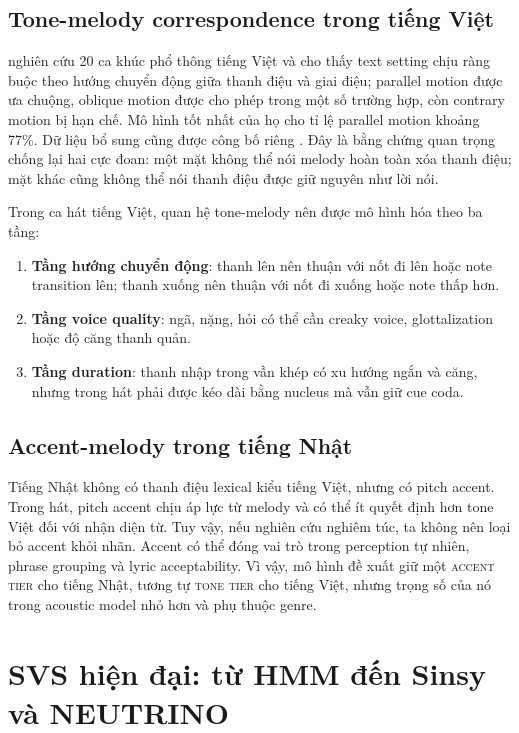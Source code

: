 \documentclass[12pt,a4paper]{article}
\newcommand{\tier}[1]{\textsc{#1}}
\begin{document}
\subsection{Tone-melody correspondence trong tiếng Việt}

\textcite{kirby2016toneMelody} nghiên cứu 20 ca khúc phổ thông tiếng Việt và cho thấy text setting chịu ràng buộc theo hướng chuyển động giữa thanh điệu và giai điệu; parallel motion được ưa chuộng, oblique motion được cho phép trong một số trường hợp, còn contrary motion bị hạn chế. Mô hình tốt nhất của họ cho tỉ lệ parallel motion khoảng 77\%. Dữ liệu bổ sung cũng được công bố riêng \parencite{kirby2016dataset}. Đây là bằng chứng quan trọng chống lại hai cực đoan: một mặt không thể nói melody hoàn toàn xóa thanh điệu; mặt khác cũng không thể nói thanh điệu được giữ nguyên như lời nói.

Trong ca hát tiếng Việt, quan hệ tone-melody nên được mô hình hóa theo ba tầng:

\begin{enumerate}
  \item \textbf{Tầng hướng chuyển động}: thanh lên nên thuận với nốt đi lên hoặc note transition lên; thanh xuống nên thuận với nốt đi xuống hoặc note thấp hơn.
  \item \textbf{Tầng voice quality}: ngã, nặng, hỏi có thể cần creaky voice, glottalization hoặc độ căng thanh quản.
  \item \textbf{Tầng duration}: thanh nhập trong vần khép có xu hướng ngắn và căng, nhưng trong hát phải được kéo dài bằng nucleus mà vẫn giữ cue coda.
\end{enumerate}

\subsection{Accent-melody trong tiếng Nhật}

Tiếng Nhật không có thanh điệu lexical kiểu tiếng Việt, nhưng có pitch accent. Trong hát, pitch accent chịu áp lực từ melody và có thể ít quyết định hơn tone Việt đối với nhận diện từ. Tuy vậy, nếu nghiên cứu nghiêm túc, ta không nên loại bỏ accent khỏi nhãn. Accent có thể đóng vai trò trong perception tự nhiên, phrase grouping và lyric acceptability. Vì vậy, mô hình đề xuất giữ một 
\tier{accent tier} cho tiếng Nhật, tương tự 
\tier{tone tier} cho tiếng Việt, nhưng trọng số của nó trong acoustic model nhỏ hơn và phụ thuộc genre.

\section{SVS hiện đại: từ HMM đến Sinsy và NEUTRINO}
\end{document}
